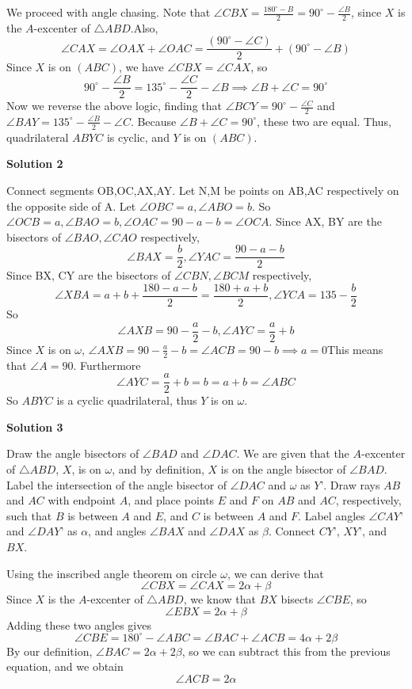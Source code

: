 \begin{enumerate}
 We proceed with angle chasing. Note that $\angle CBX = \frac{180^\circ - B}{2}= 90^\circ -\frac{\angle B}{2}$, since $X$ is the $A$-excenter of $\triangle ABD$.Also, 
 \[\angle CAX = \angle OAX + \angle OAC = \frac{(90^\circ - \angle C)}{2}+(90^\circ-\angle B)\] Since $X$ is on $(ABC)$, we have $\angle CBX = \angle CAX$, so 
 \[90^\circ -\frac{\angle B}{2} = 135^\circ - \frac{\angle C}{2}-\angle B \implies \angle B +\angle C = 90^\circ\] Now we reverse the above logic, finding that $\angle BCY = 90^\circ -\frac{\angle C}{2}$ and $\angle BAY = 135^\circ - \frac{\angle B}{2}-\angle C$. Because $\angle B+ \angle C = 90^\circ$, these two are equal. Thus, quadrilateral $ABYC$ is cyclic, and $Y$ is on $(ABC)$.

 



\textbf{Solution 2}

Connect segments OB,OC,AX,AY. Let N,M be points on AB,AC respectively on the opposite side of A. Let $\angle OBC=a, \angle ABO=b$. So $\angle OCB=a, \angle BAO=b, \angle OAC=90-a-b=\angle OCA$. Since AX, BY are the bisectors of $\angle BAO, \angle CAO$ respectively, 
 \[\angle BAX=\frac{b}{2}, \angle YAC= \frac{90-a-b}{2}\]Since BX, CY are the bisectors of $\angle CBN, \angle BCM$ respectively,
 \[\angle XBA= a+b+\frac{180-a-b}{2}=\frac{180+a+b}{2}, \angle YCA=135-\frac{b}{2}\]So 
 \[\angle AXB=90-\frac{a}{2}-b, \angle AYC= \frac{a}{2}+b\]Since $X$ is on $\omega$, $\angle AXB=90-\frac{a}{2}-b=\angle ACB=90-b\implies a=0$This means that $\angle A=90$. Furthermore
 \[\angle AYC= \frac{a}{2}+b=b=a+b=\angle ABC\]So $ABYC$ is a cyclic quadrilateral, thus $Y$ is on $\omega$.

 



\textbf{Solution 3}

Draw the angle bisectors of $\angle BAD$ and $\angle DAC$. We are given that the $A$-excenter of $\triangle ABD$, $X$, is on $\omega$, and by definition, $X$ is on the angle bisector of $\angle BAD$. Label the intersection of the angle bisector of $\angle DAC$ and $\omega$ as $Y’$. Draw rays $AB$ and $AC$ with endpoint $A$, and place points $E$ and $F$ on $AB$ and $AC$, respectively, such that $B$ is between $A$ and $E$, and $C$ is between $A$ and $F$. Label angles $\angle CAY’$ and $\angle DAY’$ as $\alpha$, and angles $\angle BAX$ and $\angle DAX$ as $\beta$. Connect $CY’$, $XY’$, and $BX$.

 
Using the inscribed angle theorem on circle $\omega$, we can derive that 
 \[\angle CBX = \angle CAX = 2\alpha + \beta\] Since $X$ is the $A$-excenter of $\triangle ABD$, we know that $BX$ bisects $\angle CBE$, so 
 \[\angle EBX=2\alpha + \beta\] Adding these two angles gives 
 \[\angle CBE = 180^{\circ}-\angle ABC = \angle BAC+\angle ACB = 4\alpha + 2\beta\] By our definition, $\angle BAC = 2\alpha + 2\beta$, so we can subtract this from the previous equation, and we obtain 
 \[\angle ACB = 2\alpha\]


\end{enumerate}
